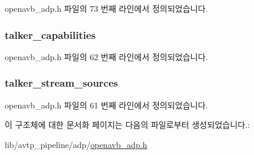 openavb\+\_\+adp.\+h 파일의 73 번째 라인에서 정의되었습니다.

\subsubsection[{\texorpdfstring{talker\+\_\+capabilities}{talker_capabilities}}]{ talker\+\_\+capabilities}\hypertarget{structopenavb__adp__data__unit__t_a3a68601d6925b6f1c051f043ce6960ea}{}\label{structopenavb__adp__data__unit__t_a3a68601d6925b6f1c051f043ce6960ea}


openavb\+\_\+adp.\+h 파일의 62 번째 라인에서 정의되었습니다.

\subsubsection[{\texorpdfstring{talker\+\_\+stream\+\_\+sources}{talker_stream_sources}}]{ talker\+\_\+stream\+\_\+sources}\hypertarget{structopenavb__adp__data__unit__t_a1cef978c7d5f0fe43e419f34dea172ab}{}\label{structopenavb__adp__data__unit__t_a1cef978c7d5f0fe43e419f34dea172ab}


openavb\+\_\+adp.\+h 파일의 61 번째 라인에서 정의되었습니다.



이 구조체에 대한 문서화 페이지는 다음의 파일로부터 생성되었습니다.\+:\begin{DoxyCompactItemize}
\item 
lib/avtp\+\_\+pipeline/adp/\hyperlink{openavb__adp_8h}{openavb\+\_\+adp.\+h}\end{DoxyCompactItemize}
